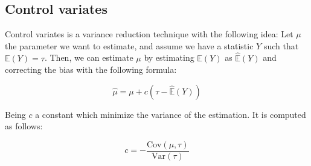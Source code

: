 \documentclass{report}
\begin{document}
\subsection{Control variates}
\label{sec:control_variates}

Control variates is a variance reduction technique with the following idea: Let \(\mu\) the parameter we want to estimate, and assume we have a statistic \(Y\) such that \(\mathbb{E}(Y) = \tau\). Then, we can estimate \(\mu\) by estimating \(\mathbb{E}(Y)\) as \(\hat{\mathbb{E}}(Y)\) and correcting the bias with the following formula:

\begin{equation} 
	\label{eq:controlvariates} 
	\hat{\mu} = \mu + c(\tau - \hat{\mathbb{E}}(Y)) 
\end{equation}

Being \(c\) a constant which minimize the variance of the estimation. It is computed as follows:

\begin{equation} 
	\label{eq:controlvariatesconstant} 
	c = -\frac{\mathrm{Cov}(\mu, \tau)}{\mathrm{Var}(\tau)}
\end{equation}
\end{document}
